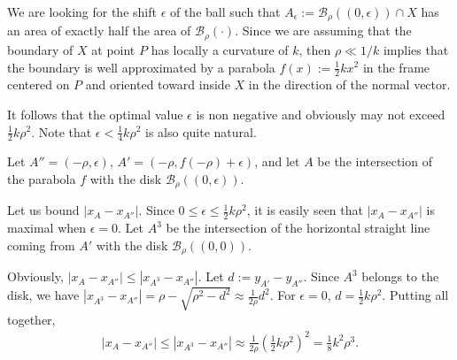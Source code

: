 \documentclass{paper}
\begin{document}
We are looking for the shift $\epsilon$ of the ball such that
$A_\epsilon := \mathcal{B}_\rho( (0,\epsilon) ) \cap X$ has an area of exactly
half the area of $\mathcal{B}_\rho(\cdot)$. Since we are assuming that the
boundary of $X$ at point $P$ has locally a curvature of $k$, then
$\rho \ll 1/k$ implies that the boundary is well approximated by a
parabola $f(x):=\frac{1}{2}kx^2$ in the frame centered on $P$ and oriented
toward inside $X$ in the direction of the normal vector.

It follows that the optimal value $\epsilon$ is non negative and
obviously may not exceed $\frac{1}{2}k\rho^2$. Note that $\epsilon <
\frac{1}{4}k\rho^2$ is also quite natural.

Let $A''=(-\rho,\epsilon)$, $A'=(-\rho,f(-\rho)+\epsilon)$, and let
$A$ be the intersection of the parabola $f$ with the disk
$\mathcal{B}_\rho( (0,\epsilon) )$.

Let us bound $|x_A -x_{A''}|$. Since $0 \le \epsilon \le
\frac{1}{2}k\rho^2$, it is easily seen that $|x_A -x_{A''}|$ is
maximal when $\epsilon=0$.
Let $A^3$ be the intersection of the horizontal straight line coming from $A'$ with the disk $\mathcal{B}_\rho((0,0))$.

Obviously, $|x_A -x_{A''}| \le |x_{A^3} -x_{A''}|$. 
Let $d:=y_{A'}-y_{A''}$. Since $A^3$ belongs to the disk, we have
$|x_{A^3} -x_{A''}| = \rho-\sqrt{\rho^2 - d^2} \approx \frac{1}{2\rho}{d^2}$.
For $\epsilon=0$, $d=\frac{1}{2}k\rho^2$.
Putting all together,
\begin{align*}
  |x_A -x_{A''}| \le |x_{A^3} -x_{A''}| 
  \approx \frac{1}{2\rho}{\left(\frac{1}{2}k\rho^2\right)^2}
  = \frac{1}{8}k^2 \rho^3.
\end{align*}



\def\Kappa{0.2}
\def\Rho{4.5}
\def\Eps{0.0}
\def\xA{-4.15}

\def\Eps{0.25*\Kappa*\Rho*\Rho}
\def\xA{-4.4}
\raisebox{5mm}{}
\end{document}

